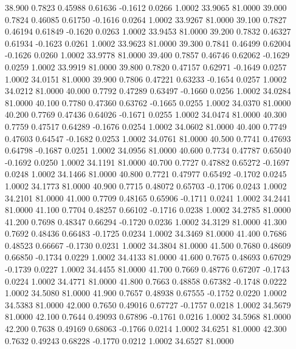   38.900   0.7823   0.45988   0.61636  -0.1612   0.0266   1.0002  33.9065  81.0000
  39.000   0.7824   0.46085   0.61750  -0.1616   0.0264   1.0002  33.9267  81.0000
  39.100   0.7827   0.46194   0.61849  -0.1620   0.0263   1.0002  33.9453  81.0000
  39.200   0.7832   0.46327   0.61934  -0.1623   0.0261   1.0002  33.9623  81.0000
  39.300   0.7841   0.46499   0.62004  -0.1626   0.0260   1.0002  33.9778  81.0000
  39.400   0.7857   0.46746   0.62062  -0.1629   0.0259   1.0002  33.9919  81.0000
  39.800   0.7820   0.47157   0.62971  -0.1649   0.0257   1.0002  34.0151  81.0000
  39.900   0.7806   0.47221   0.63233  -0.1654   0.0257   1.0002  34.0212  81.0000
  40.000   0.7792   0.47289   0.63497  -0.1660   0.0256   1.0002  34.0284  81.0000
  40.100   0.7780   0.47360   0.63762  -0.1665   0.0255   1.0002  34.0370  81.0000
  40.200   0.7769   0.47436   0.64026  -0.1671   0.0255   1.0002  34.0474  81.0000
  40.300   0.7759   0.47517   0.64289  -0.1676   0.0254   1.0002  34.0602  81.0000
  40.400   0.7749   0.47603   0.64547  -0.1682   0.0253   1.0002  34.0761  81.0000
  40.500   0.7741   0.47693   0.64798  -0.1687   0.0251   1.0002  34.0956  81.0000
  40.600   0.7734   0.47787   0.65040  -0.1692   0.0250   1.0002  34.1191  81.0000
  40.700   0.7727   0.47882   0.65272  -0.1697   0.0248   1.0002  34.1466  81.0000
  40.800   0.7721   0.47977   0.65492  -0.1702   0.0245   1.0002  34.1773  81.0000
  40.900   0.7715   0.48072   0.65703  -0.1706   0.0243   1.0002  34.2101  81.0000
  41.000   0.7709   0.48165   0.65906  -0.1711   0.0241   1.0002  34.2441  81.0000
  41.100   0.7704   0.48257   0.66102  -0.1716   0.0238   1.0002  34.2785  81.0000
  41.200   0.7698   0.48347   0.66294  -0.1720   0.0236   1.0002  34.3129  81.0000
  41.300   0.7692   0.48436   0.66483  -0.1725   0.0234   1.0002  34.3469  81.0000
  41.400   0.7686   0.48523   0.66667  -0.1730   0.0231   1.0002  34.3804  81.0000
  41.500   0.7680   0.48609   0.66850  -0.1734   0.0229   1.0002  34.4133  81.0000
  41.600   0.7675   0.48693   0.67029  -0.1739   0.0227   1.0002  34.4455  81.0000
  41.700   0.7669   0.48776   0.67207  -0.1743   0.0224   1.0002  34.4771  81.0000
  41.800   0.7663   0.48858   0.67382  -0.1748   0.0222   1.0002  34.5080  81.0000
  41.900   0.7657   0.48938   0.67555  -0.1752   0.0220   1.0002  34.5383  81.0000
  42.000   0.7650   0.49016   0.67727  -0.1757   0.0218   1.0002  34.5679  81.0000
  42.100   0.7644   0.49093   0.67896  -0.1761   0.0216   1.0002  34.5968  81.0000
  42.200   0.7638   0.49169   0.68063  -0.1766   0.0214   1.0002  34.6251  81.0000
  42.300   0.7632   0.49243   0.68228  -0.1770   0.0212   1.0002  34.6527  81.0000
